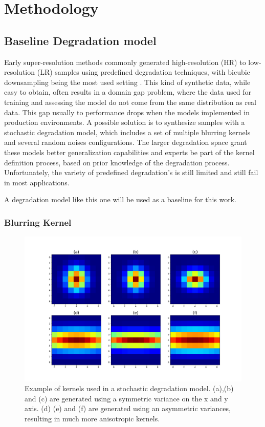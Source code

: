 \section{Methodology} \label{sec:methodology}
    
    \subsection{Baseline Degradation model} \label{subsec:baseline_degradation_model}

        Early super-resolution methods commonly generated high-resolution (HR) to low-resolution (LR) samples using predefined degradation techniques, with bicubic downsampling being the most used setting \cite{zhang2018residual}. This kind of synthetic data, while easy to obtain, often results in a domain gap problem, where the data used for training and assessing the model do not come from the same distribution as real data. This gap usually to performance drops when the models implemented in production environments. A possible solution is to synthesize samples with a stochastic degradation model, which includes a set of multiple blurring kernels and several random noises configurations. The larger degradation space grant these models better generalization capabilities and experts be part of the kernel definition process, based on prior knowledge of the degradation process. Unfortunately, the variety of predefined degradation's is still limited and still fail in most applications.

        A degradation model like this one will be used as a baseline for this work.
        

        \subsubsection{Blurring Kernel}

        \begin{figure}[h!]
                \centering
                \includegraphics[width=\linewidth]{Includes/4-degradation_kernels.pdf}
                \caption{Example of kernels used in a stochastic degradation model. (a),(b) and (c) are generated using a symmetric variance on the x and y axis. (d) (e) and (f) are generated using an asymmetric variances, resulting in much more anisotropic kernels.}
                \label{fig:4-degradation_kernels}
            \end{figure}

